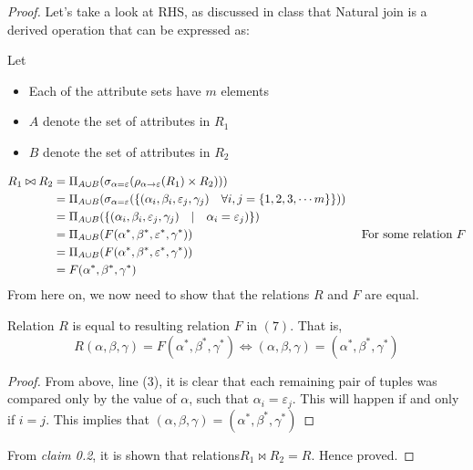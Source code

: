 \documentclass[a4paper, 11pt]{article}
\begin{document}
\begin{proof}
Let's take a look at RHS, as discussed in class that Natural join is a derived operation that can be expressed as:

Let
\begin{itemize}
\item   Each of the attribute sets have $m$ elements

\item  $A$ denote the set of attributes in $R_1$ 

\item $B$ denote the set of attributes in $R_2$ 
\end{itemize}
\begin{align}
R_1 \bowtie R_2 &= \Pi_{A \cup B} ( \sigma_{\alpha = \varepsilon} (\rho_{\alpha \rightarrow \varepsilon} (R_1) \times R_2)))\\
&=  \Pi_{A \cup B} ( \sigma_{\alpha = \varepsilon} (\{ \left (\alpha_i,\beta_i,\varepsilon_j,\gamma_j) \quad \forall i,j =\{1,2,3,\cdots m\} \right \})) \\
&= \Pi_{A \cup B} ( \{ \left (\alpha_i,\beta_i,\varepsilon_j,\gamma_j) \quad | \quad \alpha_i = \varepsilon_j  \right )\}) \\
&= \Pi_{A \cup B} ( F(\alpha^*,\beta^*,\varepsilon^*,\gamma^*)) &\textmd{ For some relation }F\\
&= \Pi_{A \cup B} ( F(\alpha^*,\beta^*,\varepsilon^*,\gamma^*)) \\ 
&= F(\alpha^*,\beta^*,\gamma^*) \\
\end{align}
From here on,
we now need to show that the relations $R$ and $F$ are equal. 
\begin{claim}
 Relation $R$ is  equal to resulting relation $F$ in $(7)$. That is,
 $$
 R(\alpha,\beta ,\gamma) = F (\alpha^*,\beta^* ,\gamma^*) \Leftrightarrow  (\alpha,\beta ,\gamma) = (\alpha^*,\beta^* ,\gamma^*)
 $$
\end{claim}
\begin{proof}
From above, line (3), it is clear that each remaining pair of tuples was compared only by the value of $\alpha$, such that  $ \alpha_i = \varepsilon_j $. This will happen if  and only if $i=j$. This implies that  $(\alpha,\beta ,\gamma) = (\alpha^*,\beta^* ,\gamma^*)$
\end{proof}
From \textit{claim 0.2}, it is shown that  relations$ R_1 \bowtie R_2 = R $. Hence proved.
\end{proof}
\end{document}
